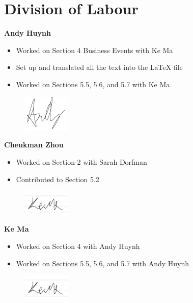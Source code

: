 \appendix
\section{Division of Labour}
\label{sec:division_of_labour}

\textbf{Andy Huynh}
\begin{itemize}
    \item Worked on Section 4 Business Events with Ke Ma
    \item Set up and translated all the text into the LaTeX file
    \item Worked on Sections 5.5, 5.6, and 5.7 with Ke Ma
\end{itemize}
\begin{figure}[H]
	\centering
	\includegraphics[width=0.2\textwidth]{Signatures/a.png}  
\end{figure}

\textbf{Cheukman Zhou}
\begin{itemize}
    \item Worked on Section 2 with Sarah Dorfman
    \item Contributed to Section 5.2
\end{itemize}
\begin{figure}[H]
	\centering
	\includegraphics[width=0.2\textwidth]{Signatures/k.png}
\end{figure}

\textbf{Ke Ma}
\begin{itemize}
    \item Worked on Section 4 with Andy Huynh
    \item Worked on Sections 5.5, 5.6, and 5.7 with Andy Huynh
\end{itemize}
\begin{figure}[H]
	\centering
	\includegraphics[width=0.2\textwidth]{Signatures/k.png}
\end{figure}

